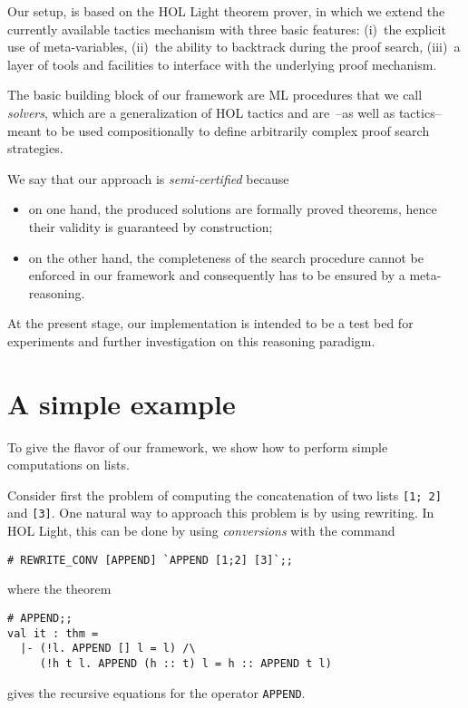 Our setup, is based on the HOL Light theorem prover, in which we
extend the currently available tactics mechanism with three basic
features: (i)~the explicit use of meta-variables, (ii)~the ability to
backtrack during the proof search, (iii)~a layer of tools and
facilities to interface with the underlying proof mechanism.

The basic building block of our framework are ML procedures that we
call \emph{solvers}, which are a generalization of HOL tactics and
are~--as well as tactics-- meant to be used compositionally to define
arbitrarily complex proof search strategies.

We say that our approach is \emph{semi-certified} because
\begin{itemize}
\item on one hand, the produced solutions are formally proved
  theorems, hence their validity is guaranteed by construction;
\item on the other hand, the completeness of the search procedure
  cannot be enforced in our framework and consequently has to be
  ensured by a meta-reasoning.
\end{itemize}

At the present stage, our implementation \citep{Maggesi:Nocentini:kanrenlight}
is intended to be a test bed for experiments and further investigation on this
reasoning paradigm.


\section{A simple example}
\label{sec:an-simple-example}

To give the flavor of our framework, we show how to perform simple
computations on lists.

Consider first the problem of computing the concatenation of two lists
\verb|[1; 2]| and \verb|[3]|.  One natural way to approach this
problem is by using rewriting.  In HOL Light, this can be done by using
\emph{conversions} with the command
\begin{verbatim}
# REWRITE_CONV [APPEND] `APPEND [1;2] [3]`;;
\end{verbatim}
where the theorem
\begin{verbatim}
# APPEND;;
val it : thm =
  |- (!l. APPEND [] l = l) /\
     (!h t l. APPEND (h :: t) l = h :: APPEND t l)
\end{verbatim}
gives the recursive equations for the operator \verb|APPEND|.


